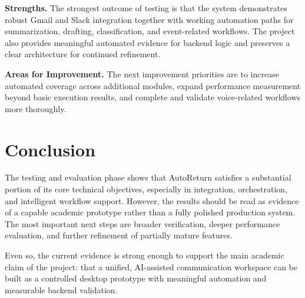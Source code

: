\textbf{Strengths.} The strongest outcome of testing is that the system demonstrates robust Gmail and Slack integration together with working automation paths for summarization, drafting, classification, and event-related workflows. The project also provides meaningful automated evidence for backend logic and preserves a clear architecture for continued refinement.

\textbf{Areas for Improvement.} The next improvement priorities are to increase automated coverage across additional modules, expand performance measurement beyond basic execution results, and complete and validate voice-related workflows more thoroughly.

\section{Conclusion}
The testing and evaluation phase shows that AutoReturn satisfies a substantial portion of its core technical objectives, especially in integration, orchestration, and intelligent workflow support. However, the results should be read as evidence of a capable academic prototype rather than a fully polished production system. The most important next steps are broader verification, deeper performance evaluation, and further refinement of partially mature features.

Even so, the current evidence is strong enough to support the main academic claim of the project: that a unified, AI-assisted communication workspace can be built as a controlled desktop prototype with meaningful automation and measurable backend validation.

